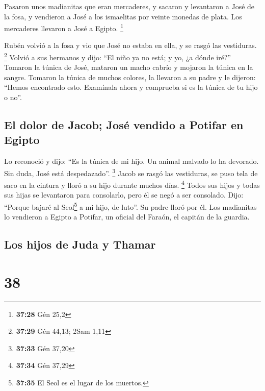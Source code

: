  Pasaron unos madianitas que eran mercaderes, y sacaron y
levantaron a José de la fosa, y vendieron a José a los ismaelitas por
veinte monedas de plata. Los mercaderes llevaron a José a Egipto.
\footnote{\textbf{37:28} Gén 25,2}

 Rubén volvió a la fosa y vio que José no estaba en ella,
y se rasgó las vestiduras. \footnote{\textbf{37:29} Gén 44,13; 2Sam 1,11}
 Volvió a sus hermanos y dijo: ``El niño ya no está; y
yo, ¿a dónde iré?''  Tomaron la túnica de José, mataron
un macho cabrío y mojaron la túnica en la sangre. 
Tomaron la túnica de muchos colores, la llevaron a su padre y le
dijeron: ``Hemos encontrado esto. Examínala ahora y comprueba si es la
túnica de tu hijo o no''.

\hypertarget{el-dolor-de-jacob-josuxe9-vendido-a-potifar-en-egipto}{%
\subsection{El dolor de Jacob; José vendido a Potifar en
Egipto}\label{el-dolor-de-jacob-josuxe9-vendido-a-potifar-en-egipto}}

 Lo reconoció y dijo: ``Es la túnica de mi hijo. Un
animal malvado lo ha devorado. Sin duda, José está despedazado''.
\footnote{\textbf{37:33} Gén 37,20}  Jacob se rasgó las
vestiduras, se puso tela de saco en la cintura y lloró a su hijo durante
muchos días. \footnote{\textbf{37:34} Gén 37,29}  Todos
sus hijos y todas sus hijas se levantaron para consolarlo, pero él se
negó a ser consolado. Dijo: ``Porque bajaré al Seol\footnote{\textbf{37:35}
  El Seol es el lugar de los muertos.} a mi hijo, de luto''. Su padre
lloró por él.  Los madianitas lo vendieron a Egipto a
Potifar, un oficial del Faraón, el capitán de la guardia.

\hypertarget{los-hijos-de-juda-y-thamar}{%
\subsection{Los hijos de Juda y
Thamar}\label{los-hijos-de-juda-y-thamar}}

\hypertarget{section-37}{%
\section{38}\label{section-37}}

